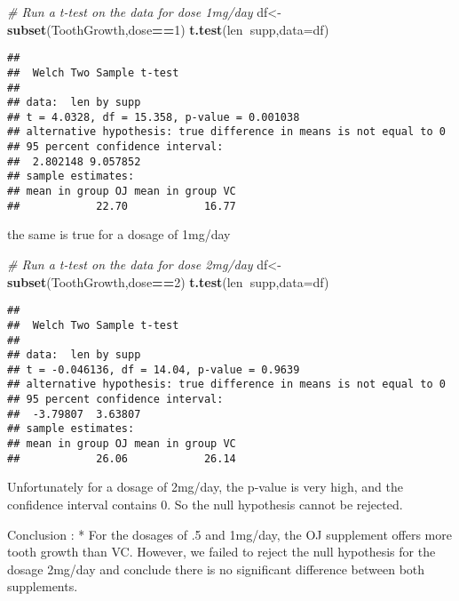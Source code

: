 \documentclass[
]{article}
\newenvironment{Shaded}{\begin{snugshade}}{\end{snugshade}}
\newcommand{\CommentTok}[1]{\textcolor[rgb]{0.56,0.35,0.01}{\textit{#1}}}
\newcommand{\DataTypeTok}[1]{\textcolor[rgb]{0.13,0.29,0.53}{#1}}
\newcommand{\DecValTok}[1]{\textcolor[rgb]{0.00,0.00,0.81}{#1}}
\newcommand{\KeywordTok}[1]{\textcolor[rgb]{0.13,0.29,0.53}{\textbf{#1}}}
\newcommand{\NormalTok}[1]{#1}
\newcommand{\OperatorTok}[1]{\textcolor[rgb]{0.81,0.36,0.00}{\textbf{#1}}}
\begin{document}
\begin{Shaded}
\begin{Highlighting}[]
\CommentTok{# Run a t-test on the data for dose 1mg/day}
\NormalTok{df<-}\KeywordTok{subset}\NormalTok{(ToothGrowth,dose}\OperatorTok{==}\DecValTok{1}\NormalTok{)}
\KeywordTok{t.test}\NormalTok{(len}\OperatorTok{~}\NormalTok{supp,}\DataTypeTok{data=}\NormalTok{df)}
\end{Highlighting}
\end{Shaded}

\begin{verbatim}
## 
##  Welch Two Sample t-test
## 
## data:  len by supp
## t = 4.0328, df = 15.358, p-value = 0.001038
## alternative hypothesis: true difference in means is not equal to 0
## 95 percent confidence interval:
##  2.802148 9.057852
## sample estimates:
## mean in group OJ mean in group VC 
##            22.70            16.77
\end{verbatim}

the same is true for a dosage of 1mg/day

\begin{Shaded}
\begin{Highlighting}[]
\CommentTok{# Run a t-test on the data for dose 2mg/day}
\NormalTok{df<-}\KeywordTok{subset}\NormalTok{(ToothGrowth,dose}\OperatorTok{==}\DecValTok{2}\NormalTok{)}
\KeywordTok{t.test}\NormalTok{(len}\OperatorTok{~}\NormalTok{supp,}\DataTypeTok{data=}\NormalTok{df)}
\end{Highlighting}
\end{Shaded}

\begin{verbatim}
## 
##  Welch Two Sample t-test
## 
## data:  len by supp
## t = -0.046136, df = 14.04, p-value = 0.9639
## alternative hypothesis: true difference in means is not equal to 0
## 95 percent confidence interval:
##  -3.79807  3.63807
## sample estimates:
## mean in group OJ mean in group VC 
##            26.06            26.14
\end{verbatim}

Unfortunately for a dosage of 2mg/day, the p-value is very high, and the
confidence interval contains 0. So the null hypothesis cannot be
rejected.

Conclusion : * For the dosages of .5 and 1mg/day, the OJ supplement
offers more tooth growth than VC. However, we failed to reject the null
hypothesis for the dosage 2mg/day and conclude there is no significant
difference between both supplements.
\end{document}

